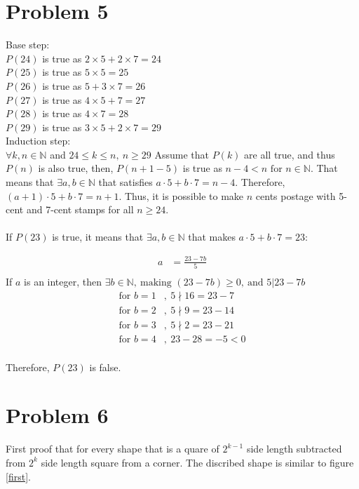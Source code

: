 \documentclass{article}
\begin{document}
\section*{Problem 5}
        Base step:\\
        \(P(24)\) is true as \(2\times 5+2\times 7=24\)\\
        \(P(25)\) is true as \(5\times 5=25\)\\
        \(P(26)\) is true as \(5+3\times 7=26\)\\
        \(P(27)\) is true as \(4\times 5 + 7 = 27\)\\
        \(P(28)\) is true as \(4\times 7=28\)\\
        \(P(29)\) is true as \(3\times 5 + 2\times 7 = 29\)\\
        Induction step:\\
        \(\forall k,n\in \mathbb{N}\) and \(24\leqslant k\leqslant n ,\ n\geqslant 29\) 
        Assume that \(P(k)\) are all true, and thus \(P(n)\) is also true, then, \(P(n+1-5)\) is true
        as \(n-4<n \text{ for }n\in \mathbb{N}\). That means that \(\exists a,b\in \mathbb{N}\) that satisfies \(a\cdot 5 + b\cdot 7 = n-4\).
        Therefore, \((a+1)\cdot 5+b\cdot 7=n+1\). Thus, it is possible to make \(n\) cents postage with 5-cent and 7-cent stamps for all \(n\geqslant 24\).
        \\  \\
        If \(P(23)\) is true, it means that \(\exists a,b\in \mathbb{N}\) that makes \(a\cdot 5+b\cdot 7=23\):

        \begin{align*}
            a&=\frac {23-7b}{5}\\
        \end{align*}
        If \(a\) is an integer, then \(\exists b\in \mathbb{N},\ \text{making } (23-7b)\geqslant0,\ \text{and }5|23-7b\)
        \begin{align*}
            \text{for }b=1&, \ 5\nmid 16=23-7\\
            \text{for }b=2&, \ 5\nmid 9=23-14\\
            \text{for }b=3&, \ 5\nmid 2=23-21\\
            \text{for }b=4&, \ 23-28=-5<0\\
        \end{align*}

        Therefore, \(P(23)\) is false.
\newpage
\section*{Problem 6}
        First proof that for every shape that is a quare of \(2^{k-1}\) side length subtracted from \(2^k\) side length square from a corner. The discribed shape is similar to figure \ref{first}.
\end{document}
